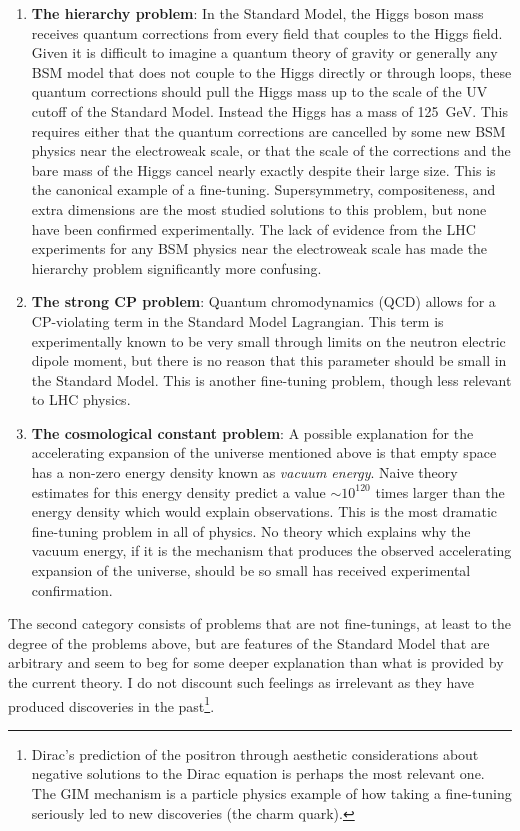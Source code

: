 \begin{enumerate}
    \item{
        \textbf{The hierarchy problem}: In the Standard Model, the Higgs boson mass receives quantum corrections from every field that couples to the Higgs field.
        Given it is difficult to imagine a quantum theory of gravity or generally any BSM model that does not couple to the Higgs directly or through loops, these quantum corrections should pull the Higgs mass up to the scale of the UV cutoff of the Standard Model.
        Instead the Higgs has a mass of 125~GeV.
        This requires either that the quantum corrections are cancelled by some new BSM physics near the electroweak scale, or that the scale of the corrections and the bare mass of the Higgs cancel nearly exactly despite their large size.
        This is the canonical example of a fine-tuning.
        Supersymmetry, compositeness, and extra dimensions are the most studied solutions to this problem, but none have been confirmed experimentally.
        The lack of evidence from the LHC experiments for any BSM physics near the electroweak scale has made the hierarchy problem significantly more confusing.
    }
    \item{
        \textbf{The strong CP problem}: Quantum chromodynamics (QCD) allows for a CP-violating term in the Standard Model Lagrangian.
        This term is experimentally known to be very small through limits on the neutron electric dipole moment, but there is no reason that this parameter should be small in the Standard Model.
        This is another fine-tuning problem, though less relevant to LHC physics.
    }
    \item{
        \textbf{The cosmological constant problem}: A possible explanation for the accelerating expansion of the universe mentioned above is that empty space has a non-zero energy density known as \textit{vacuum energy}.
        Naive theory estimates for this energy density predict a value $\sim 10^{120}$ times larger than the energy density which would explain observations.
        This is the most dramatic fine-tuning problem in all of physics.
        No theory which explains why the vacuum energy, if it is the mechanism that produces the observed accelerating expansion of the universe, should be so small has received experimental confirmation.
    }
\end{enumerate}

The second category consists of problems that are not fine-tunings, at least to the degree of the problems above, but are features of the Standard Model that are arbitrary and seem to beg for some deeper explanation than what is provided by the current theory.
I do not discount such feelings as irrelevant as they have produced discoveries in the past\footnote{Dirac's prediction of the positron through aesthetic considerations about negative solutions to the Dirac equation is perhaps the most relevant one. The GIM mechanism is a particle physics example of how taking a fine-tuning seriously led to new discoveries (the charm quark).}.

